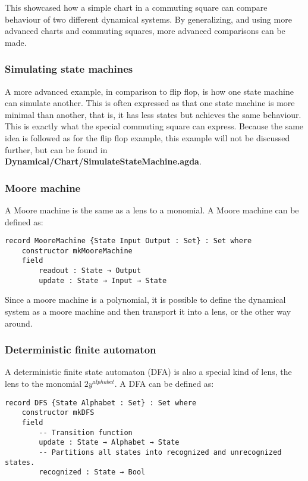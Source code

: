 This showcased how a simple chart in a commuting square can compare behaviour of two different dynamical systems. By generalizing, and using more advanced charts and commuting squares, more advanced comparisons can be made.

\subsubsection{Simulating state machines}
A more advanced example, in comparison to flip flop, is how one state machine can simulate another. This is often expressed as that one state machine is more minimal than another, that is, it has less states but achieves the same behaviour. This is exactly what the special commuting square can express. Because the same idea is followed as for the flip flop example, this example will not be discussed further, but can be found in \textbf{Dynamical/Chart/SimulateStateMachine.agda}.

\subsubsection{Moore machine}
A Moore machine is the same as a lens to a monomial. A Moore machine can be defined as:

\begin{verbatim}
record MooreMachine {State Input Output : Set} : Set where
    constructor mkMooreMachine
    field
        readout : State → Output
        update : State → Input → State
\end{verbatim}

Since a moore machine is a polynomial, it is possible to define the dynamical system as a moore machine and then transport it into a lens, or the other way around.

\subsubsection{Deterministic finite automaton}
A deterministic finite state automaton (DFA) is also a special kind of lens, the lens to the monomial $2y^{alphabet}$. A DFA can be defined as:
\begin{verbatim}
record DFS {State Alphabet : Set} : Set where
    constructor mkDFS
    field
        -- Transition function
        update : State → Alphabet → State
        -- Partitions all states into recognized and unrecognized states.
        recognized : State → Bool
\end{verbatim}

